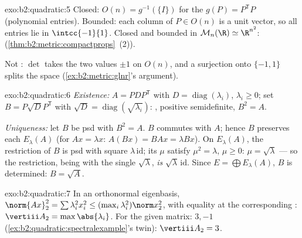 \begin{solution}{exo:b2:quadratic:5}
Closed: $O(n) = g^{-1}(\{I\})$ for the  $g(P) =
P^{\mathsf T}P$ (polynomial entries). Bounded: each column of $P
\in O(n)$ is a unit vector, so all entries lie in $\intcc{-1}{1}$.
Closed and bounded in $\mathcal{M}_n(\R) \simeq \R^{n^2}$: 
(\cref{thm:b2:metric:compactprops}~(2)).

Not : $\det$ takes the two values $\pm1$ on $O(n)$, and a
 surjection onto $\{-1, 1\}$ splits the space
(\cref{ex:b2:metric:glnr}'s argument).
\end{solution}

\begin{solution}{exo:b2:quadratic:6}
\emph{Existence:} $A = PDP^{\mathsf T}$ with $D =
\operatorname{diag}(\lambda_i)$, $\lambda_i \geq 0$; set $B =
P\sqrt D P^{\mathsf T}$ with $\sqrt D =
\operatorname{diag}(\sqrt{\lambda_i})$: , positive
semidefinite, $B^2 = A$.

\emph{Uniqueness:} let $B$ be  psd with $B^2 = A$. $B$
commutes with $A$; hence $B$ preserves each 
$E_\lambda(A)$ (for $Ax = \lambda x$: $A(Bx) = BAx = \lambda Bx$).
On $E_\lambda(A)$, the restriction of $B$ is  psd with
square $\lambda\,\mathrm{id}$; its  $\mu$ satisfy $\mu^2
= \lambda$, $\mu \geq 0$: $\mu = \sqrt\lambda$ --- so the
restriction, being  with the single 
$\sqrt\lambda$, \emph{is} $\sqrt\lambda\,\mathrm{id}$. Since $E =
\bigoplus E_\lambda(A)$, $B$ is determined: $B = \sqrt A$.
\end{solution}

\begin{solution}{exo:b2:quadratic:7}
In an orthonormal eigenbasis, $\norm{Ax}_2^2 = \sum \lambda_i^2
x_i^2 \leq (\max_i \lambda_i^2)\norm x_2^2$, with equality at the
corresponding : $\vertiii A_2 = \max\abs{\lambda_i}$.
For the given matrix:  $3, -1$
(\cref{ex:b2:quadratic:spectralexample}'s twin):
$\vertiii A_2 = 3$.
\end{solution}

